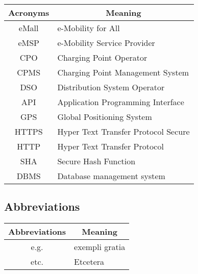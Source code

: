 \begin{table}[H]
\centering
\begin{tabular}{|c|l|}
\hline
\rowcolor[HTML]{B8C8D5} 
\textbf{Acronyms} & \multicolumn{1}{c|}{\cellcolor[HTML]{B8C8D5}\textbf{Meaning}} \\ \hline
eMall             & e-Mobility for All                                            \\ \hline
eMSP              & e-Mobility Service Provider                                   \\ \hline
CPO               & Charging Point Operator                                       \\ \hline
CPMS              & Charging Point Management System                              \\ \hline
DSO               & Distribution System Operator                                  \\ \hline
API               & Application Programming Interface                             \\ \hline
GPS               & Global Positioning System                                                    \\ \hline
HTTPS             & Hyper Text Transfer Protocol Secure                           \\ \hline
HTTP          & Hyper Text Transfer Protocol                                                      \\ \hline
SHA           & Secure Hash Function                                        \\ \hline
DBMS               & Database management system                                                 \\ \hline
\end{tabular}

\end{table}
\subsection{Abbreviations}

\begin{table}[H]
\centering
\begin{tabular}{|c|l|}
\hline
\rowcolor[HTML]{B8C8D5} 
\textbf{Abbreviations} & \multicolumn{1}{c|}{\cellcolor[HTML]{B8C8D5}\textbf{Meaning}}\\ \hline
e.g. & exempli gratia \\ \hline
etc. & Etcetera \\ \hline
\end{tabular}
\end{table}
\clearpage
